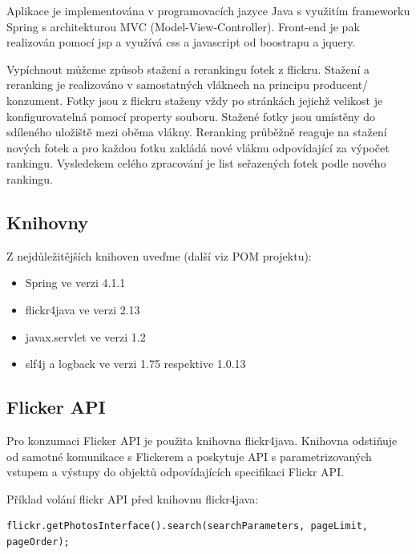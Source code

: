 \documentclass[12pt,oneside,a4paper]{article}
\begin{document}
Aplikace je implementována v programovacích jazyce Java s využitím frameworku Spring s architekturou MVC (Model-View-Controller).
Front-end je pak realizován pomocí jsp a využívá css a javascript od boostrapu a jquery.

Vypíchnout můžeme způsob stažení a rerankingu fotek z flickru. Stažení a reranking je realizováno v samostatných vláknech na principu producent/ konzument. Fotky jsou z flickru staženy vždy po stránkách jejichž velikost je konfigurovatelná pomocí property souboru. Stažené fotky jsou umístěny do sdíleného uložiště mezi oběma vlákny. Reranking průběžně reaguje na stažení nových fotek a pro každou fotku zakládá nové vláknu odpovídající za výpočet rankingu. Vysledekem celého zpracování je list seřazených fotek podle nového rankingu.

\subsection{Knihovny}

Z nejdůležitějších knihoven uveďme (další viz POM projektu):
\begin{itemize}
	\item Spring ve verzi 4.1.1
	\item flickr4java ve verzi 2.13
	\item javax.servlet ve verzi 1.2
	\item slf4j a logback ve verzi 1.75 respektive 1.0.13
\end{itemize}

\subsection{Flicker API}

Pro konzumaci Flicker API je použita knihovna flickr4java. Knihovna odstiňuje od samotné komunikace s Flickerem a poskytuje API s parametrizovaných vstupem a výstupy do objektů odpovídajících specifikaci Flickr API. 

Příklad volání flickr API před knihovnu flickr4java:
\begin{verbatim}
flickr.getPhotosInterface().search(searchParameters, pageLimit, pageOrder);
\end{verbatim}
\end{document}

